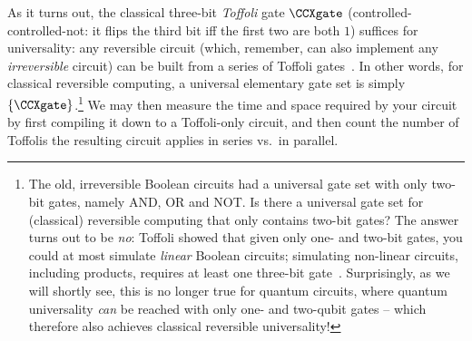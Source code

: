       As it turns out, the classical three-bit \emph{Toffoli} gate $\CCXgate$
        (controlled-controlled-not: it flips the third bit iff the first two
        are both $1$) suffices for universality: any reversible circuit (which,
        remember, can also implement any \emph{irreversible} circuit) can be
        built from a series of Toffoli gates~\cite{Toffoli80}. In other words, for
        classical reversible computing, a
        universal elementary gate set is simply $\{ \CCXgate \}$.\footnote{
          The old, irreversible Boolean circuits had a universal gate set with
          only two-bit gates, namely AND, OR and NOT. Is there a universal gate set for
          (classical) reversible computing that only contains two-bit gates? The
          answer turns out to be \emph{no}: Toffoli showed that given only one-
          and two-bit gates, you could at most simulate \emph{linear} Boolean
          circuits; simulating non-linear circuits, including products, requires
          at least one three-bit gate~\cite{Toffoli80}.
          Surprisingly, as we will shortly see, this is no longer true for
          quantum circuits, where quantum universality \emph{can} be reached with
          only one- and two-qubit gates -- which therefore also achieves classical
          reversible universality!
        } We may then measure the time and space required by your circuit by
        first compiling it down to a Toffoli-only circuit, 
        and then count the number of Toffolis the resulting circuit applies in
        series vs.\ in parallel. 

